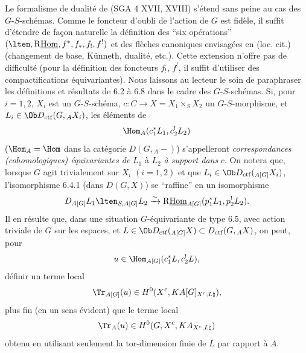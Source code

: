Le formalisme de dualité de (SGA 4 XVII, XVIII) s'étend sans peine au cas des $G$-$S$-schémas. Comme le foncteur d'oubli de l'action de $G$ est fidèle, il suffit d'étendre de façon naturelle la définition des ``six opérations'' $(\lten,\mathrm{R}\underline{\mathrm{Hom}},f^*,f_*,f_!,f^!)$ et des flèches canoniques envisagées en (loc. cit.) (changement de base, Künneth, dualité, etc.). Cette extension n'offre pas de difficulté (pour la définition des foncteurs $f_!$, $f^!$, il suffit d'utiliser des compactifications équivariantes). Nous laissons au lecteur le soin de paraphraser les définitions et résultats de 6.2 à 6.8 dans le cadre des $G$-$S$-schémas. Si, pour $i=1,2$, $X_i$ est un $G$-$S$-schéma, $c:C\to X=X_1\times_SX_2$ un $G$-$S$-morphisme, et $L_i\in\Ob D_{\mathrm{ctf}}(G,{}_AX_i)$, les éléments de
\[
\Hom_A(c_1^*L_1,c_2^!L_2)
\]
($\Hom_A=\Hom$ dans la catégorie $D(G,{}_A-)$) s'appelleront \emph{correspondances (cohomologiques) équivariantes de} $L_1$ à $L_2$ \emph{à support dans} $c$. On notera que, lorsque $G$ agit trivialement sur $X_i$ $(i=1,2)$ et que $L_i\in\Ob D_{\mathrm{ctf}}({}_{A[G]}X_i)$, l'isomorphisme 6.4.1 (dans $D(G,X)$) se ``raffine'' en un isomorphisme
\[
D_{A[G]}L_1\lten_{S,A[G]}L_2
\xrightarrow{\sim}
\mathrm{R}\underline{\mathrm{Hom}}_{A[G]}(p_1^*L_1,p_2^!L_2).
\]
Il en résulte que, dans une situation $G$-équivariante de type 6.5, avec action triviale de $G$ sur les espaces, et $L\in\Ob D_{\mathrm{ctf}}({}_{A[G]}X)\subset D_{\mathrm{ctf}}(G,{}_AX)$, on peut, pour
\[
u\in\Hom_{A[G]}(c_1^*L,c_2^!L),
\]
définir un terme local
\[
\Tr_{A[G]}(u)\in H^0(X^c,KA[G]_{X^c,L\natural}),
\]
plus fin (en un sens évident) que le terme local
\[
\Tr_A(u)\in H^0(G,X^c,KA_{X^c,L\natural})
\]
obtenu en utilisant seulement la tor-dimension finie de $L$ par rapport à $A$.

